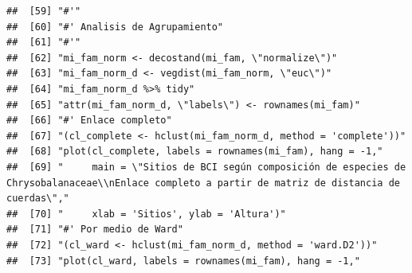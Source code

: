 \documentclass[11pt,]{article}
\begin{document}
\begin{verbatim}
##  [59] "#'"                                                                                                                                                                    
##  [60] "#' Analisis de Agrupamiento"                                                                                                                                           
##  [61] "#'"                                                                                                                                                                    
##  [62] "mi_fam_norm <- decostand(mi_fam, \"normalize\")"                                                                                                                       
##  [63] "mi_fam_norm_d <- vegdist(mi_fam_norm, \"euc\")"                                                                                                                        
##  [64] "mi_fam_norm_d %>% tidy"                                                                                                                                                
##  [65] "attr(mi_fam_norm_d, \"labels\") <- rownames(mi_fam)"                                                                                                                   
##  [66] "#' Enlace completo"                                                                                                                                                    
##  [67] "(cl_complete <- hclust(mi_fam_norm_d, method = 'complete'))"                                                                                                           
##  [68] "plot(cl_complete, labels = rownames(mi_fam), hang = -1,"                                                                                                               
##  [69] "     main = \"Sitios de BCI según composición de especies de Chrysobalanaceae\\nEnlace completo a partir de matriz de distancia de cuerdas\","                         
##  [70] "     xlab = 'Sitios', ylab = 'Altura')"                                                                                                                                
##  [71] "#' Por medio de Ward"                                                                                                                                                  
##  [72] "(cl_ward <- hclust(mi_fam_norm_d, method = 'ward.D2'))"                                                                                                                
##  [73] "plot(cl_ward, labels = rownames(mi_fam), hang = -1,"                                                                                                                   

\end{verbatim}
\end{document}
